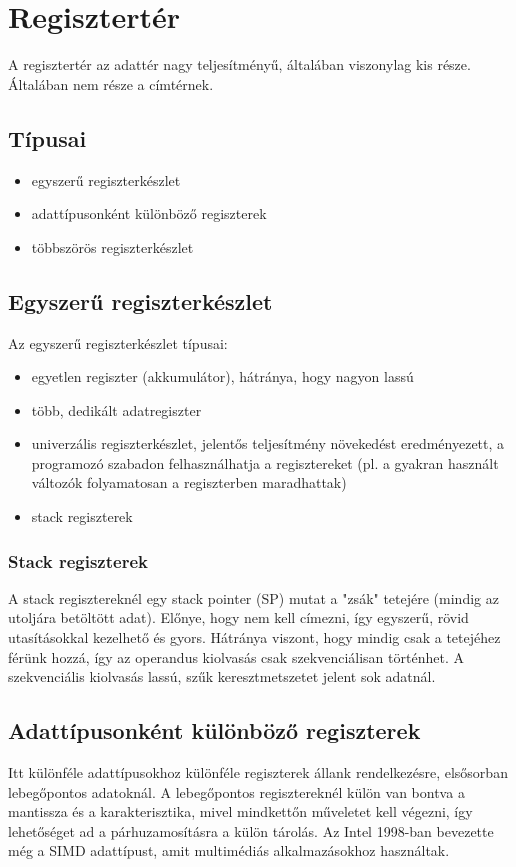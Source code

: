 \section{Regisztertér}
A regisztertér az adattér nagy teljesítményű, általában viszonylag kis része.
Általában nem része a címtérnek.

\subsection{Típusai}
\begin{itemize}
    \item egyszerű regiszterkészlet
    \item adattípusonként különböző regiszterek
    \item többszörös regiszterkészlet
\end{itemize}

\subsection{Egyszerű regiszterkészlet}
Az egyszerű regiszterkészlet típusai:
\begin{itemize}
    \item egyetlen regiszter (akkumulátor), hátránya, hogy nagyon lassú
    \item több, dedikált adatregiszter
    \item univerzális regiszterkészlet, jelentős teljesítmény növekedést eredményezett, a programozó szabadon felhasználhatja a regisztereket (pl. a gyakran használt változók folyamatosan a regiszterben maradhattak)
    \item stack regiszterek
\end{itemize}

\subsubsection{Stack regiszterek}
A stack regisztereknél egy stack pointer (SP) mutat a "zsák" tetejére (mindig az utoljára betöltött adat).
Előnye, hogy nem kell címezni, így egyszerű, rövid utasításokkal kezelhető és gyors.
Hátránya viszont, hogy mindig csak a tetejéhez férünk hozzá, így az operandus kiolvasás csak szekvenciálisan történhet.
A szekvenciális kiolvasás lassú, szűk keresztmetszetet jelent sok adatnál.

\subsection{Adattípusonként különböző regiszterek}
Itt különféle adattípusokhoz különféle regiszterek állank rendelkezésre, elsősorban lebegőpontos adatoknál.
A lebegőpontos regisztereknél külön van bontva a mantissza és a karakterisztika, mivel mindkettőn műveletet kell végezni, így lehetőséget ad a párhuzamosításra a külön tárolás.
Az Intel 1998-ban bevezette még a SIMD adattípust, amit multimédiás alkalmazásokhoz használtak.

